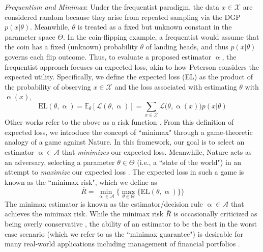 \documentclass[letterpaper,12pt]{article}
\newcommand{\given}{|}
\begin{document}
\textit{Frequentism and Minimax}: Under the frequentist paradigm, the data $x \in \mathcal{X}$ are considered random because they arise from repeated sampling via the DGP $p(x \given \theta)$. Meanwhile, $\theta$ is treated as a fixed but unknown constant in the parameter space $\Theta$. In the coin-flipping example, a frequentist would assume that the coin has a fixed (unknown) probability $\theta$ of landing heads, and thus $p(x\given \theta)$ governs each flip outcome. Thus, to evaluate a proposed estimator $\upalpha$, the frequentist approach focuses on expected loss, akin to how Peterson \cite{peterson2017} considers the expected utility. Specifically, we define the expected loss (EL) as the product of the probability of observing $x \in \mathcal{X}$ and the loss associated with estimating $\theta$ with $\upalpha(x)$,
\begin{equation}
	\text{EL}(\theta, \upalpha) = \mathbb{E}_{\theta}[\mathcal{L}(\theta, \upalpha)] = \sum_{x \in \mathcal{X}} \mathcal{L}\big( \theta, \upalpha(x) \big) p(x \given \theta)  \label{eq:EL}
\end{equation}
Other works refer to the above as a risk function \cite{nikulin2001}. From this definition of expected loss, we introduce the concept of ``minimax" through a game-theoretic analogy of a game against Nature. In this framework, our goal is to select an estimator $\upalpha \in \mathcal{A}$ that \textit{minimizes} our expected loss. Meanwhile, Nature acts as an adversary, selecting a parameter $\theta \in \Theta$ (i.e., a ``state of the world") in an attempt to \textit{maximize} our expected loss \cite{ulansky2021}. The expected loss in such a game is known as the ``minimax risk", which we define as
\begin{equation}
	\overline{{R}} = \min_{\upalpha \in \mathcal{A}}\bigg\{ \max_{\theta \in \Theta} \bigg\{ \text{EL}(\theta, \upalpha) \bigg\} \bigg\} \label{eq:minimaxrisk}
\end{equation}
The minimax estimator is known as the estimator/decision rule $\upalpha \in \mathcal{A}$ that achieves the minimax risk. While the minimax risk $\overline{R}$ is occasionally criticized as being overly conservative \cite{peterson2017}, the ability of an estimator to be the best in the worst case scenario (which we refer to as the ``minimax guarantee") is desirable for many real-world applications including management of financial portfolios \cite{DENG2005278}.
\end{document}
